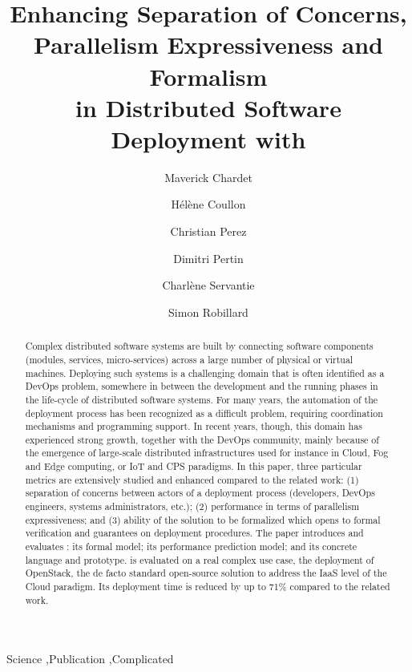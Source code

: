 \documentclass[5p]{elsarticle}
\begin{document}
\begin{frontmatter}

  \title{Enhancing Separation of Concerns, Parallelism Expressiveness and 
  Formalism\\ in Distributed Software Deployment with \mad}

  \author[label1]{Maverick Chardet}
  \author[label1]{Hélène Coullon}
  \author[label2]{Christian Perez}
  \author[label1]{Dimitri Pertin}
  \author[label1]{Charlène Servantie}
  \author[label1]{Simon Robillard}

\address[label1]{IMT Atlantique, Inria, LS2N, UBL, F-44307 Nantes, France}
\address[label2]{Univ Lyon, Inria, EnsL, UCBL, CNRS, LIP, Lyon, France}


\begin{abstract}
Complex distributed software systems are built by connecting software components 
(\eg modules, services, micro-services) across a large number of physical or virtual
machines.
Deploying such systems is a challenging domain that is often 
identified as a DevOps problem, \ie somewhere in between the development and the 
running phases in the life-cycle of distributed software systems. 
%
For many years, the automation of the deployment process has been recognized as a 
difficult problem, requiring coordination mechanisms and programming support. In 
recent years, though, this domain has experienced strong growth, together with the 
DevOps community, mainly because of the emergence of large-scale distributed 
infrastructures used for instance in Cloud, Fog and Edge computing, or IoT and CPS 
paradigms.
In this paper, three particular metrics are extensively studied and 
enhanced compared to the related work: (1) separation of concerns between 
actors of a deployment process (developers, DevOps engineers, systems 
administrators, etc.); (2) performance in terms of parallelism expressiveness; 
and (3) ability of the solution to be formalized which opens to formal 
verification and guarantees on deployment procedures.
The paper introduces and evaluates \mad: its formal model; its performance 
prediction model; and its concrete language and prototype. \mad is evaluated on a 
real complex use case, the deployment of OpenStack, the de facto standard open-source solution to 
address the IaaS level of the Cloud paradigm. Its deployment time is
reduced by up to 71\% compared to the related work.
\end{abstract}

\begin{keyword}
Science \sep Publication \sep Complicated
\end{keyword}

\end{frontmatter}
\end{document}
